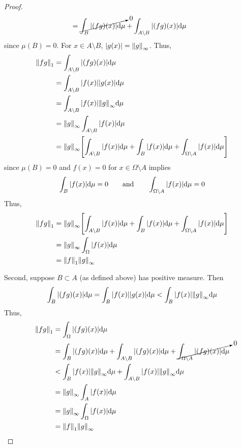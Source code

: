 \documentclass{article} %
\theoremstyle{plain}
\numberwithin{equation}{section} %
\numberwithin{figure}{section} %
\numberwithin{table}{section} %
\begin{document}
\begin{proof}
\begin{align*}
        &= \cancelto{0}{\int_B \abs{(fg)(x)} \dd\mu} + \int_{A\setminus B} \abs{(fg)(x)} \dd\mu
    \end{align*}
    since $\mu(B) = 0$.  For $x \in A\setminus B$, $\abs{g(x)} = \norm{g}_\infty$.  Thus,
    \begin{align*}
        \norm{fg}_1 &= \int_{A\setminus B} \abs{(fg)(x)} \dd\mu \\
        &= \int_{A\setminus B} \abs{f(x)}\abs{g(x)} \dd\mu \\
        &= \int_{A\setminus B} \abs{f(x)} \norm{g}_\infty \dd\mu \\
        &= \norm{g}_\infty \int_{A\setminus B} \abs{f(x)} \dd\mu \\
        &= \norm{g}_\infty \qty[\int_{A\setminus B} \abs{f(x)} \dd\mu + \int_{B} \abs{f(x)} \dd\mu + \int_{\Omega\setminus A} \abs{f(x)} \dd\mu]
    \end{align*}
    since $\mu(B) = 0$ and $f(x) = 0$ for $x \in \Omega\setminus A$ implies
    \begin{align*}
        \int_{B} \abs{f(x)} \dd\mu = 0 \qquad \text{and} \qquad \int_{\Omega\setminus A} \abs{f(x)} \dd\mu = 0
    \end{align*}
    Thus,
    \begin{align*}
        \norm{fg}_1 &= \norm{g}_\infty \qty[\int_{A\setminus B} \abs{f(x)} \dd\mu + \int_{B} \abs{f(x)} \dd\mu + \int_{\Omega\setminus A} \abs{f(x)} \dd\mu] \\
        &= \norm{g}_\infty \int_\Omega \abs{f(x)}\dd\mu \\
        &= \norm{f}_1\norm{g}_\infty
    \end{align*}

    Second, suppose $B \subset A$ (as defined above) has positive measure.  Then
    \begin{align*}
        \int_B \abs{(fg)(x)} \dd\mu = \int_B \abs{f(x)}\abs{g(x)} \dd\mu <  \int_B \abs{f(x)}\norm{g}_\infty \dd\mu
    \end{align*}
    Thus,
    \begin{align*}
        \norm{fg}_1 &= \int_\Omega \abs{(fg)(x)}\dd\mu \\
        &= \int_B \abs{(fg)(x)}\dd\mu + \int_{A\setminus B} \abs{(fg)(x)}\dd\mu + \cancelto{0}{\int_{\Omega\setminus A} \abs{(fg)(x)}\dd\mu} \\
        &< \int_B \abs{f(x)}\norm{g}_\infty\dd\mu + \int_{A\setminus B} \abs{f(x)}\norm{g}_\infty\dd\mu \\
        &= \norm{g}_\infty \int_A \abs{f(x)} \dd\mu \\
        &= \norm{g}_\infty \int_\Omega \abs{f(x)} \dd\mu \\
        &= \norm{f}_1\norm{g}_\infty
    \end{align*}
\end{proof}
\end{document}
